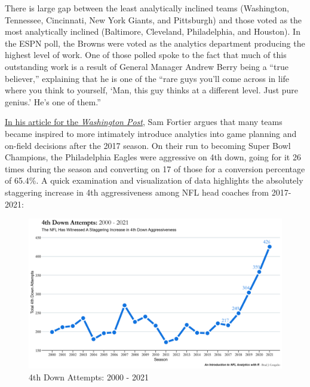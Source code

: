 \documentclass[
  letterpaper,
]{krantz}
\begin{document}
There is large gap between the least analytically inclined teams
(Washington, Tennessee, Cincinnati, New York Giants, and Pittsburgh) and
those voted as the most analytically inclined (Baltimore, Cleveland,
Philadelphia, and Houston). In the ESPN poll, the Browns were voted as
the analytics department producing the highest level of work. One of
those polled spoke to the fact that much of this outstanding work is a
result of General Manager Andrew Berry being a ``true believer,''
explaining that he is one of the ``rare guys you'll come across in life
where you think to yourself, `Man, this guy thinks at a different level.
Just pure genius.' He's one of them.''

\href{https://www.washingtonpost.com/sports/2020/01/16/nfls-analytics-movement-has-finally-reached-sports-mainstream/}{In
his article for the \emph{Washington Post}}, Sam Fortier argues that
many teams became inspired to more intimately introduce analytics into
game planning and on-field decisions after the 2017 season. On their run
to becoming Super Bowl Champions, the Philadelphia Eagles were
aggressive on 4th down, going for it 26 times during the season and
converting on 17 of those for a conversion percentage of 65.4\%. A quick
examination and visualization of data highlights the absolutely
staggering increase in 4th aggressiveness among NFL head coaches from
2017-2021:

\begin{figure}

{\centering \includegraphics[width=1\textwidth,height=\textheight]{./images/4th-down-attempts.png}

}

\caption{4th Down Attempts: 2000 - 2021}

\end{figure}
\end{document}
